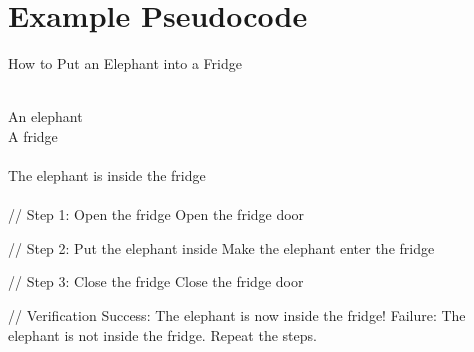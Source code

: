  \appendix	
 
 \chapter{Example Pseudocode}
 \label{example pseudocode}

\begin{breakablealgorithm}
\caption{How to Put an Elephant into a Fridge} 
\label{alg:ElephantFridge} 
\begin{algorithmic}
\REQUIRE~~\\
An elephant\\
A fridge\\

\ENSURE~~\\
The elephant is inside the fridge\\

\PROCESS~~\\
\STATE // Step 1: Open the fridge
\STATE Open the fridge door

\STATE // Step 2: Put the elephant inside
\STATE Make the elephant enter the fridge

\STATE // Step 3: Close the fridge
\STATE Close the fridge door

\STATE // Verification
\STATE Success: The elephant is now inside the fridge!
\ELSE
\STATE Failure: The elephant is not inside the fridge. Repeat the steps.
\ENDIF
\end{algorithmic}
\end{breakablealgorithm}
